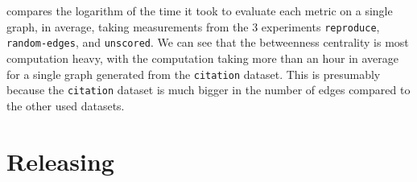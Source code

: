  compares the logarithm of the time it took to evaluate each metric on a single graph, in average, taking measurements from the 3 experiments \texttt{reproduce}, \texttt{random-edges}, and \texttt{unscored}.
We can see that the betweenness centrality is most computation heavy, with the computation taking more than an hour in average for a single graph generated from the \texttt{citation} dataset.
This is presumably because the \texttt{citation} dataset is much bigger in the number of edges compared to the other used datasets.




\section{Releasing \graffs}

